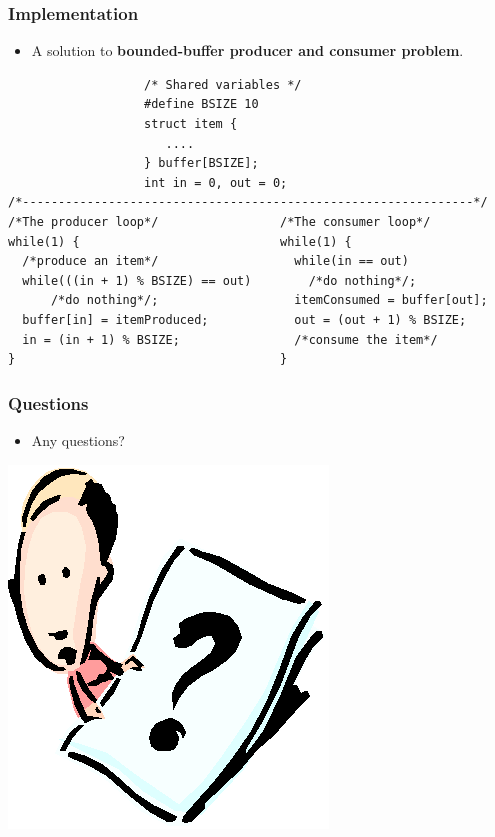 \documentclass[CJKutf8,xcolor=pdftex,dvipsnames,table]{beamer}
\begin{document}
\begin{CJK*}{UTF8}{song}
\fi

  \begin{frame}[fragile]
  \frametitle{Implementation} \pause
  \begin{itemize}
  \item{A solution to \textbf{bounded-buffer producer and consumer problem}.} \pause
  \end{itemize}
\begin{lstlisting}
                   /* Shared variables */
                   #define BSIZE 10
                   struct item {
                      ....
                   } buffer[BSIZE];
                   int in = 0, out = 0;
/*---------------------------------------------------------------*/
/*The producer loop*/                 /*The consumer loop*/
while(1) {                            while(1) {
  /*produce an item*/                   while(in == out)
  while(((in + 1) % BSIZE) == out)        /*do nothing*/;
      /*do nothing*/;                   itemConsumed = buffer[out];
  buffer[in] = itemProduced;            out = (out + 1) % BSIZE;
  in = (in + 1) % BSIZE;                /*consume the item*/
}                                     }
\end{lstlisting}
\end{frame}

  \begin{frame}
  \frametitle{Questions}
  \begin{itemize}
  \item{Any questions?}
  \end{itemize}
  \begin{center}
    \includegraphics[scale=.5]{question}
  \end{center}
  \end{frame}


\end{CJK*}
\end{document}
